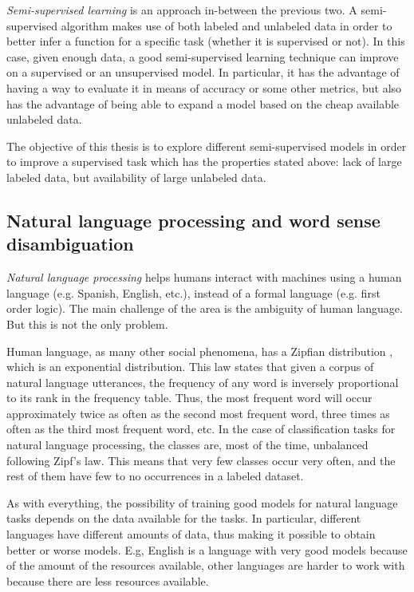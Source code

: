 {\em Semi-supervised learning} is an approach in-between the previous two. A
semi-supervised algorithm makes use of both labeled and unlabeled data in order
to better infer a function for a specific task (whether it is supervised or
not). In this case, given enough data, a good semi-supervised learning
technique can improve on a supervised or an unsupervised model. In particular,
it has the advantage of having a way to evaluate it in means of accuracy or
some other metrics, but also has the advantage of being able to expand a model
based on the cheap available unlabeled data.

The objective of this thesis is to explore different semi-supervised models in
order to improve a supervised task which has the properties stated above: lack
of large labeled data, but availability of large unlabeled data.

\subsection{Natural language processing and word sense disambiguation}

{\em Natural language processing} helps humans interact with machines using a
human language (e.g. Spanish, English, etc.), instead of a formal language
(e.g. first order logic). The main challenge of the area is the ambiguity of
human language. But this is not the only problem.

Human language, as many other social phenomena, has a Zipfian distribution
\cite{j:zpf}, which is an exponential distribution. This law states that given
a corpus of natural language utterances, the frequency of any word is inversely
proportional to its rank in the frequency table. Thus, the most frequent word
will occur approximately twice as often as the second most frequent word, three
times as often as the third most frequent word, etc. In the case of
classification tasks for natural language processing, the classes are, most of
the time, unbalanced following Zipf's law. This means that very few classes
occur very often, and the rest of them have few to no occurrences in a labeled
dataset. 

As with everything, the possibility of training good models for natural
language tasks depends on the data available for the tasks. In particular,
different languages have different amounts of data, thus making it possible to
obtain better or worse models. E.g, English is a language with very good models
because of the amount of the resources available, other languages are harder to
work with because there are less resources available.

